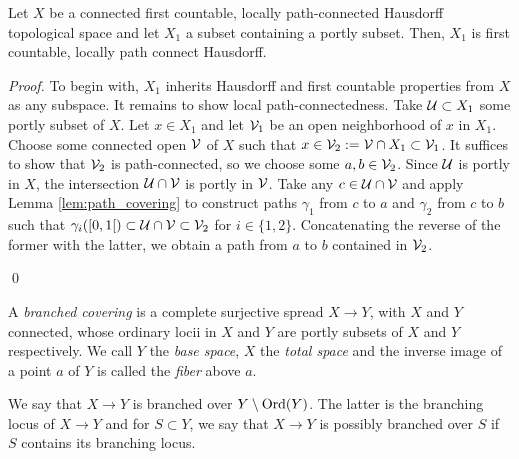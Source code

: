 \begin{lem}\label{lem:portly_first_countable} Let $X$ be a connected first countable, locally path-connected Hausdorff topological space and let $X_1$ a subset containing a portly subset. Then, $X_1$ is first countable, locally path connect Hausdorff.
\end{lem}
\begin{proof} To begin with, $X_1$ inherits Hausdorff and first countable properties from $X$ as any subspace. It remains to show local path-connectedness.
Take $\mathcal{U}\subset X_1$ some portly subset of $X$. 
 Let $x\in X_1$ and let $\mathcal V_1$ be an open neighborhood of $x$ in $X_1$. Choose some connected open $\mathcal V$ of $X$ such that $x\in \mathcal V_2:=\mathcal V\cap X_1 \subset \mathcal V_1$. 
 It suffices to show that $\mathcal V_2$ is path-connected, so we choose some $a,b\in \mathcal V_2$.
 Since $\mathcal{U}$ is portly in $X$, the intersection $\mathcal{U}\cap \mathcal V$ is portly in $\mathcal V$. Take any $c\in \mathcal{U}\cap \mathcal V$ and apply Lemma \ref{lem:path_covering} to construct paths $\gamma_1$ from $c$ to $a$ and $\gamma_2$ from $c$ to $b$ such that $\gamma_{i}([0,1[)\subset \mathcal{U}\cap \mathcal V\subset \mathcal V_2$ for $i\in \{1,2\}$. Concatenating the reverse of the former with the latter, we obtain a path from $a$ to $b$ contained in $\mathcal V_2$. 
 
\qed\end{proof}





\begin{defi}\label{def:branched_covering}  A {\it branched covering} is a complete surjective spread $X\rightarrow Y$, with $X$ and $Y$ connected, whose ordinary locii in $X$ and $Y$ are portly subsets of $X$ and $Y$ respectively. We call $Y$ the {\it base space}, $X$ the {\it total space} and the inverse image of a point $a$ of $Y$ is called the {\it fiber} above $a$.
 
 We say that $X\rightarrow Y$ is branched over $Y\setminus \mathrm{Ord}(Y)$. The latter is the branching locus of $X\rightarrow Y$ and for $S\subset Y$, we say that $X\rightarrow Y$ is possibly branched over $S$ if $S$ contains its branching locus.

 \end{defi}
 


 
 
